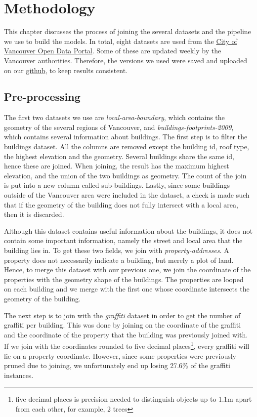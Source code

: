 \chapter{Methodology}


This chapter discusses the process of joining the several datasets and the pipeline we use to build the models. In total, eight datasets are used from the \href{https://opendata.vancouver.ca/pages/home/}{City of Vancouver Open Data Portal}. Some of these are updated weekly by the Vancouver authorities. Therefore, the versions we used were saved and uploaded on our \href{https://github.com/CowKeyMan/PredictingGraffitiUsingCityLayouts}{github}, to keep results consistent.

\section{Pre-processing}

The first two datasets we use are \textit{local-area-boundary}, which contains the geometry of the several regions of Vancouver, and \textit{buildings-footprints-2009}, which contains several information about buildings. The first step is to filter the buildings dataset. All the columns are removed except the building id, roof type, the highest elevation and the geometry. Several buildings share the same id, hence these are joined. When joining, the result has the maximum highest elevation, and the union of the two buildings as geometry. The count of the join is put into a new column called sub-buildings. Lastly, since some buildings outside of the Vancouver area were included in the dataset, a check is made such that if the geometry of the building does not fully intersect with a local area, then it is discarded.

Although this dataset contains useful information about the buildings, it does not contain some important information, namely the street and local area that the building lies in. To get these two fields, we join with \textit{property-addresses}. A property does not necessarily indicate a building, but merely a plot of land. Hence, to merge this dataset with our previous one, we join the coordinate of the properties with the geometry shape of the buildings. The properties are looped on each building and we merge with the first one whose coordinate intersects the geometry of the building.

The next step is to join with the \textit{graffiti} dataset in order to get the number of graffiti per building. This was done by joining on the coordinate of the graffiti and the coordinate of the property that the building was previously joined with. If we join with the coordinates rounded to five decimal places\footnote{five decimal places is precision needed to distinguish objects up to 1.1m apart from each other, for example, 2 trees}, every graffiti will lie on a property coordinate. However, since some properties were previously pruned due to joining, we unfortunately end up losing 27.6\% of the graffiti instances.

